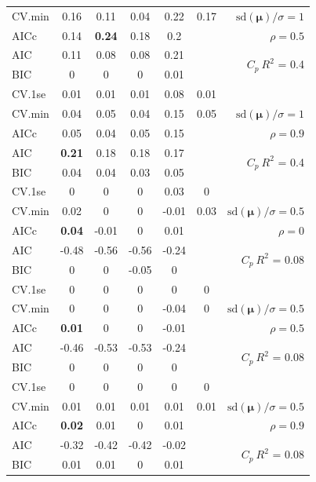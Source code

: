 \documentclass[12pt]{article}
\newcommand{\mr}[1]{\mathrm{#1}}
\newcommand{\bm}[1]{\mathbf{#1}}
\begin{document}
\begin{table}[p]
\begin{center}
\begin{tabular}{l*{5}{c}|r}
CV.min & 0.16 & 0.11 & 0.04 & 0.22 & 0.17 &  $\mr{sd}(\bm{\mu})/\sigma=1$ \\
AICc & 0.14 & {\bf 0.24} & 0.18 & 0.2 & & $\rho=0.5$ \\
AIC & 0.11 & 0.08 & 0.08 & 0.21 & & \multirow{2}{*}{$C_p ~ R^2$ = 0.4} \\
BIC & 0 & 0 & 0 & 0.01 & & \\
 \hline 
CV.1se & 0.01 & 0.01 & 0.01 & 0.08 & 0.01 &\\
CV.min & 0.04 & 0.05 & 0.04 & 0.15 & 0.05 &  $\mr{sd}(\bm{\mu})/\sigma=1$ \\
AICc & 0.05 & 0.04 & 0.05 & 0.15 & & $\rho=0.9$ \\
AIC & {\bf 0.21} & 0.18 & 0.18 & 0.17 & & \multirow{2}{*}{$C_p ~ R^2$ = 0.4} \\
BIC & 0.04 & 0.04 & 0.03 & 0.05 & & \\
 \hline 
CV.1se & 0 & 0 & 0 & 0.03 & 0 &\\
CV.min & 0.02 & 0 & 0 & -0.01 & 0.03 &  $\mr{sd}(\bm{\mu})/\sigma=0.5$ \\
AICc & {\bf 0.04} & -0.01 & 0 & 0.01 & & $\rho=0$ \\
AIC & -0.48 & -0.56 & -0.56 & -0.24 & & \multirow{2}{*}{$C_p ~ R^2$ = 0.08} \\
BIC & 0 & 0 & -0.05 & 0 & & \\
 \hline 
CV.1se & 0 & 0 & 0 & 0 & 0 &\\
CV.min & 0 & 0 & 0 & -0.04 & 0 &  $\mr{sd}(\bm{\mu})/\sigma=0.5$ \\
AICc & {\bf 0.01} & 0 & 0 & -0.01 & & $\rho=0.5$ \\
AIC & -0.46 & -0.53 & -0.53 & -0.24 & & \multirow{2}{*}{$C_p ~ R^2$ = 0.08} \\
BIC & 0 & 0 & 0 & 0 & & \\
 \hline 
CV.1se & 0 & 0 & 0 & 0 & 0 &\\
CV.min & 0.01 & 0.01 & 0.01 & 0.01 & 0.01 &  $\mr{sd}(\bm{\mu})/\sigma=0.5$ \\
AICc & {\bf 0.02} & 0.01 & 0 & 0.01 & & $\rho=0.9$ \\
AIC & -0.32 & -0.42 & -0.42 & -0.02 & & \multirow{2}{*}{$C_p ~ R^2$ = 0.08} \\
BIC & 0.01 & 0.01 & 0 & 0.01 & & \\
 \hline 
\end{tabular}
\end{center}
\vspace{-1cm}
\end{table}
\end{document}
